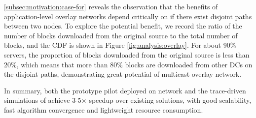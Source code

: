  \Section\ref{subsec:motivation:case-for} reveals the observation that the benefits of application-level overlay networks depend critically on if there exist disjoint paths between two nodes. To explore the potential benefit, we record the ratio of the number of blocks downloaded from the original source to the total number of blocks, and the CDF is shown in Figure \ref{fig:analysis:overlay}. For about 90\% servers, the proportion of blocks downloaded from the original source is less than 20\%, which means that more than 80\% blocks are downloaded from other DCs on the disjoint paths, demonstrating great potential of multicast overlay network.

In summary, both the prototype pilot deployed on \company network and the trace-driven simulations of \name achieve 3-5$\times$ speedup over existing solutions, with good scalability, fast algorithm convergence and lightweight resource consumption.

